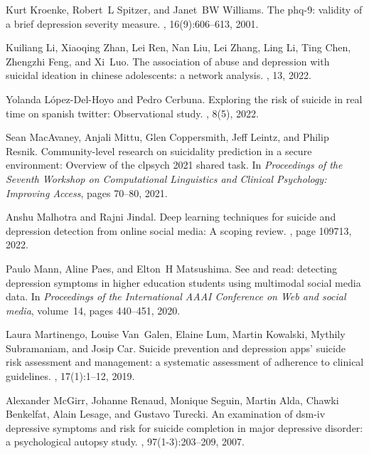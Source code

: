 \begin{thebibliography}{10}
Kurt Kroenke, Robert~L Spitzer, and Janet~BW Williams.
\newblock The phq-9: validity of a brief depression severity measure.
, 16(9):606--613, 2001.

Kuiliang Li, Xiaoqing Zhan, Lei Ren, Nan Liu, Lei Zhang, Ling Li, Ting Chen,
  Zhengzhi Feng, and Xi~Luo.
\newblock The association of abuse and depression with suicidal ideation in
  chinese adolescents: a network analysis.
, 13, 2022.

Yolanda L{\'o}pez-Del-Hoyo and Pedro Cerbuna.
\newblock Exploring the risk of suicide in real time on spanish twitter:
  Observational study.
, 8(5), 2022.

Sean MacAvaney, Anjali Mittu, Glen Coppersmith, Jeff Leintz, and Philip Resnik.
\newblock Community-level research on suicidality prediction in a secure
  environment: Overview of the clpsych 2021 shared task.
\newblock In {\em Proceedings of the Seventh Workshop on Computational
  Linguistics and Clinical Psychology: Improving Access}, pages 70--80, 2021.

Anshu Malhotra and Rajni Jindal.
\newblock Deep learning techniques for suicide and depression detection from
  online social media: A scoping review.
, page 109713, 2022.

Paulo Mann, Aline Paes, and Elton~H Matsushima.
\newblock See and read: detecting depression symptoms in higher education
  students using multimodal social media data.
\newblock In {\em Proceedings of the International AAAI Conference on Web and
  social media}, volume~14, pages 440--451, 2020.

Laura Martinengo, Louise Van~Galen, Elaine Lum, Martin Kowalski, Mythily
  Subramaniam, and Josip Car.
\newblock Suicide prevention and depression apps’ suicide risk assessment and
  management: a systematic assessment of adherence to clinical guidelines.
, 17(1):1--12, 2019.

Alexander McGirr, Johanne Renaud, Monique Seguin, Martin Alda, Chawki
  Benkelfat, Alain Lesage, and Gustavo Turecki.
\newblock An examination of dsm-iv depressive symptoms and risk for suicide
  completion in major depressive disorder: a psychological autopsy study.
, 97(1-3):203--209, 2007.


\end{thebibliography}
